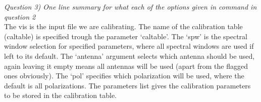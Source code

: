 \documentclass[12pt, a4paper]{article}
\begin{document}
\noindent \textit{Question 3) One line summary for what each of the options given in command in question 2} \\
The vis is the input file we are calibrating. The name of the calibration table (caltable) is specified trough the parameter `caltable'. The `spw' is the spectral window selection for specified parameters, where all spectral windows are used if left to its default. The `antenna' argument selects which antenna should be used, again leaving it empty means all antennas will be used (apart from the flagged ones obviously). The `pol' specifies which polarization will be used, where the default is all polarizations. The parameters list gives the calibration parameters to be stored in the calibration table. \\

\end{document}
